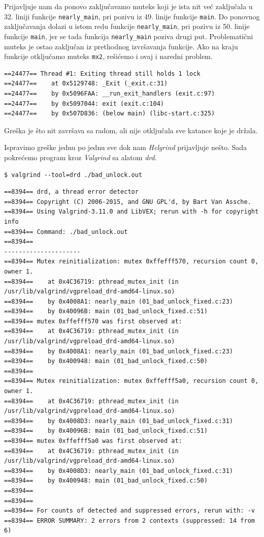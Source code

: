 Prijavljuje nam da ponovo zaključavamo muteks koji je ista nit već zaključala u 32. liniji funkcije \texttt{nearly\_main}, pri pozivu iz 49. linije funkcije \texttt{main}. Do ponovnog zaključavanja dolazi u istom redu funkcije \texttt{nearly\_main}, pri pozivu iz 50. linije funkcije \texttt{main}, jer se tada funkcija \texttt{nearly\_main} poziva drugi put. Problematični muteks je ostao zaključan iz prethodnog izvršavanja funkcije. Ako na kraju funkcije otključamo muteks \texttt{mx2}, rešićemo i ovaj i naredni problem.

\begin{verbatim}
==24477== Thread #1: Exiting thread still holds 1 lock
==24477==    at 0x5129748: _Exit (_exit.c:31)
==24477==    by 0x5096FAA: __run_exit_handlers (exit.c:97)
==24477==    by 0x5097044: exit (exit.c:104)
==24477==    by 0x507D836: (below main) (libc-start.c:325)
\end{verbatim}

Greška je što nit završava sa radom, ali nije otključala sve katance koje je držala.

Ispravimo greške jednu po jednu sve dok nam \emph{Helgrind} prijavljuje nešto. Sada pokrećemo program kroz \emph{Valgrind} sa alatom \emph{drd}.

\begin{verbatim}
$ valgrind --tool=drd ./bad_unlock.out
\end{verbatim}

\begin{verbatim}
==8394== drd, a thread error detector
==8394== Copyright (C) 2006-2015, and GNU GPL'd, by Bart Van Assche.
==8394== Using Valgrind-3.11.0 and LibVEX; rerun with -h for copyright info
==8394== Command: ./bad_unlock.out
==8394==
---------------------
==8394== Mutex reinitialization: mutex 0xffefff570, recursion count 0, owner 1.
==8394==    at 0x4C36719: pthread_mutex_init (in /usr/lib/valgrind/vgpreload_drd-amd64-linux.so)
==8394==    by 0x4008A1: nearly_main (01_bad_unlock_fixed.c:23)
==8394==    by 0x40096B: main (01_bad_unlock_fixed.c:51)
==8394== mutex 0xffefff570 was first observed at:
==8394==    at 0x4C36719: pthread_mutex_init (in /usr/lib/valgrind/vgpreload_drd-amd64-linux.so)
==8394==    by 0x4008A1: nearly_main (01_bad_unlock_fixed.c:23)
==8394==    by 0x400948: main (01_bad_unlock_fixed.c:50)
==8394==
==8394== Mutex reinitialization: mutex 0xffefff5a0, recursion count 0, owner 1.
==8394==    at 0x4C36719: pthread_mutex_init (in /usr/lib/valgrind/vgpreload_drd-amd64-linux.so)
==8394==    by 0x4008D3: nearly_main (01_bad_unlock_fixed.c:31)
==8394==    by 0x40096B: main (01_bad_unlock_fixed.c:51)
==8394== mutex 0xffefff5a0 was first observed at:
==8394==    at 0x4C36719: pthread_mutex_init (in /usr/lib/valgrind/vgpreload_drd-amd64-linux.so)
==8394==    by 0x4008D3: nearly_main (01_bad_unlock_fixed.c:31)
==8394==    by 0x400948: main (01_bad_unlock_fixed.c:50)
==8394==
==8394==
==8394== For counts of detected and suppressed errors, rerun with: -v
==8394== ERROR SUMMARY: 2 errors from 2 contexts (suppressed: 14 from 6)
\end{verbatim}

